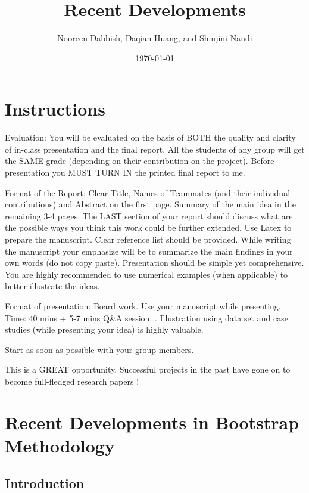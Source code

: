 \documentclass[11pt]{article}
\title{Recent Developments}
\author{Nooreen Dabbish, Daqian Huang, and Shinjini Nandi}
\date{\today}
\begin{document}
\maketitle


\begin{abstract}

\end{abstract}

\section{Instructions}
\label{sec-1}

Evaluation: You will be evaluated on the basis of BOTH the quality and
clarity of in-class presentation and the final report. All the
students of any group will get the SAME grade (depending on their
contribution on the project). Before presentation you MUST TURN IN the
printed final report to me.
 
Format of the Report: Clear Title, Names of Teammates (and their
individual contributions) and Abstract on the first page. Summary of
the main idea in the remaining 3-4 pages. The LAST section of your
report should discuss what are the possible ways you think this work
could be further extended. Use Latex to prepare the manuscript. Clear
reference list should be provided. While writing the manuscript your
emphasize will be to summarize the main findings in your own words (do
not copy paste). Presentation should be simple yet comprehensive. You
are highly recommended to use numerical examples (when applicable) to
better illustrate the ideas. 
 
Format of presentation: Board work. Use your manuscript while
presenting. Time: 40 mins + 5-7 mins Q\&A session. . Illustration using
data set and case studies (while presenting your idea) is highly
valuable. 
 
Start as soon as possible with your group members.
 
This is a GREAT opportunity. Successful projects in the past have gone
on to become full-fledged research papers !
\section{Recent Developments in Bootstrap Methodology}
\label{sec-2}
\subsection{Introduction}
\label{sec-2-1}
\end{document}
